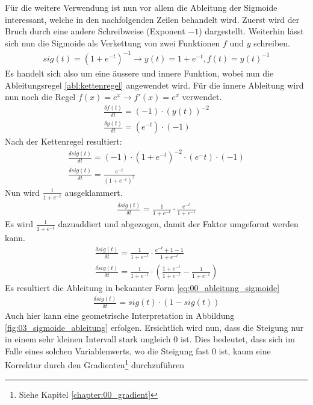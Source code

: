 Für die weitere Verwendung ist nun vor allem die Ableitung der Sigmoide interessant, welche in den nachfolgenden
Zeilen behandelt wird. Zuerst wird der Bruch durch eine andere Schreibweise (Exponent $-1$) dargestellt. Weiterhin
lässt sich nun die Sigmoide als Verkettung von zwei Funktionen $f$ und $y$ schreiben.
\begin{align}
    sig(t) = (1 + e^{-t})^{-1} \longrightarrow y(t) = 1 + e^{-t}, f(t) = y(t)^{-1}
\end{align}
Es handelt sich also um eine äussere und innere Funktion, wobei nun die Ableitungsregel \ref{abl:kettenregel} angewendet wird.
Für die innere Ableitung wird nun noch die Regel $f(x) = e^x \longrightarrow f'(x) = e^x$ verwendet.
\begin{align}
    \frac{\delta f(t)}{\delta t} = (-1) \cdot (y(t))^{-2}\\
    \frac{\delta y(t)}{\delta t} = (e^{-t}) \cdot (-1)
\end{align}
Nach der Kettenregel resultiert:
\begin{align}
    \frac{\delta sig(t)}{\delta t} = (-1) \cdot (1 + e^{-t})^{-2} \cdot (e^-t) \cdot (-1)\\
    \frac{\delta sig(t)}{\delta t} = \frac{e^{-t}}{(1 + e^{-t})^{2}}
\end{align}
Nun wird $\frac{1}{1 + e^{-t}}$ ausgeklammert.
\begin{align}
    \frac{\delta sig(t)}{\delta t} = \frac{1}{1 + e^{-t}} \cdot \frac{e^{-t}}{1 + e^{-t}}
\end{align}
Es wird $\frac{1}{1 + e^{-t}}$ dazuaddiert und abgezogen, damit der Faktor umgeformt werden kann.
\begin{align}
    \frac{\delta sig(t)}{\delta t} = \frac{1}{1 + e^{-t}} \cdot \frac{e^{-t} + 1 - 1}{1 + e^{-t}}\\
    \frac{\delta sig(t)}{\delta t} = \frac{1}{1 + e^{-t}} \cdot (\frac{1 + e^{-t}}{1 + e^{-t}} - \frac{1}{1 + e^{-t}})
\end{align}
Es resultiert die Ableitung in bekannter Form \ref{eq:00_ableitung_sigmoide}
\begin{align}
    \frac{\delta sig(t)}{\delta t} = sig(t) \cdot (1 - sig(t))\label{eq:00_ableitung_sigmoide}
\end{align}
Auch hier kann eine geometrische Interpretation in Abbildung \ref{fig:03_sigmoide_ableitung} erfolgen. Ersichtlich
wird nun, dass die Steigung nur in einem sehr kleinen Intervall stark ungleich $0$ ist. Dies bedeutet, dass sich im
Falle eines solchen Variablenwerts, wo die Steigung fast $0$ ist, kaum eine Korrektur durch den Gradienten\footnote{Siehe Kapitel \ref{chapter:00_gradient}} durchzuführen

